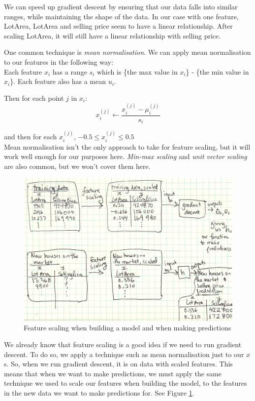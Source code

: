 \documentclass[11pt]{article}
\begin{document}
    We can speed up gradient descent by ensuring that our data falls into similar ranges, while maintaining the shape of the data. In our case with one feature, LotArea, LotArea and selling price seem to have a linear relationship. After scaling LotArea, it will still have a linear relationship with selling price. 

    One common technique is \textit{mean normalisation}. We can apply mean normalisation to our features in the following way: \\
    
    Each feature $x_i$ has a range $s_i$ which is \{the max value in $x_i$\} - \{the min value in $x_i$\}. Each feature also has a mean $u_i$.
    
    Then for each point $j$ in $x_i$:
    \[
        x_i^{(j)} \leftarrow \frac{x_i^{(j)} - \mu_i^{(j)}}{s_i}
    \]

    and then for each $x_i^{(j)} $, $-0.5 \leq x_i^{(j)}  \leq 0.5$ \\
    
    Mean normalisation isn't the only approach to take for feature scaling, but it will work well enough for our purposes here. \textit{Min-max scaling} and \textit{unit vector scaling} are also common, but we won't cover them here. 
    
    
    \begin{figure}
        \includegraphics[width=\textwidth]{feature-scaling-data}
        \caption{Feature scaling when building a model and when making predictions }
        \label{fig:feature-scaling-data}
    \end{figure}
    
    We already know that feature scaling is a good idea if we need to run gradient descent. To do so, we apply a technique such as mean normalisation just to our $x$s.  So, when we run gradient descent, it is on data with scaled features. This means that when we want to make predictions, we must apply the same technique we used to scale our features when building the model, to the features in the new data we want to make predictions for. See Figure \ref{fig:feature-scaling-data}.
    
\end{document}
